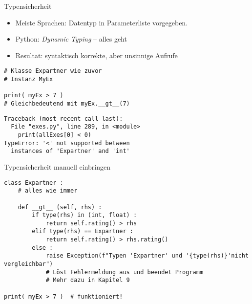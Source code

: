 \begin{frame}[fragile]{Typensicherheit}
%
\begin{itemize}
\item Meiste Sprachen: Datentyp in Parameterliste vorgegeben.
\item Python: \emph{Dynamic Typing} -- alles geht
\item Resultat: syntaktisch korrekte, aber unsinnige Aufrufe
\end{itemize}
%
\begin{tcbraster}[raster columns=2,
                  raster equal height,
                  nobeforeafter,
                  raster column skip=0.5cm]
\begin{codebox}
\begin{verbatim}
# Klasse Expartner wie zuvor
# Instanz MyEx

print( myEx > 7 )
# Gleichbedeutend mit myEx.__gt__(7)
\end{verbatim}
\end{codebox}
%
\begin{cmdbox}
\begin{verbatim}
Traceback (most recent call last):
  File "exes.py", line 289, in <module>
    print(allExes[0] < 0)
TypeError: '<' not supported between
  instances of 'Expartner' and 'int'
\end{verbatim}
\end{cmdbox}
\end{tcbraster}
%
\end{frame}


\begin{frame}[fragile]{Typensicherheit manuell einbringen}
%
\begin{codebox}
\begin{verbatim}
class Expartner :
    # alles wie immer
    
    def __gt__ (self, rhs) :
        if type(rhs) in (int, float) :
            return self.rating() > rhs
        elif type(rhs) == Expartner :
            return self.rating() > rhs.rating()
        else :
            raise Exception(f"Typen 'Expartner' und '{type(rhs)}'nicht vergleichbar")
            # Löst Fehlermeldung aus und beendet Programm
            # Mehr dazu in Kapitel 9

print( myEx > 7 )  # funktioniert!
\end{verbatim}
\end{codebox}
%
\end{frame}

